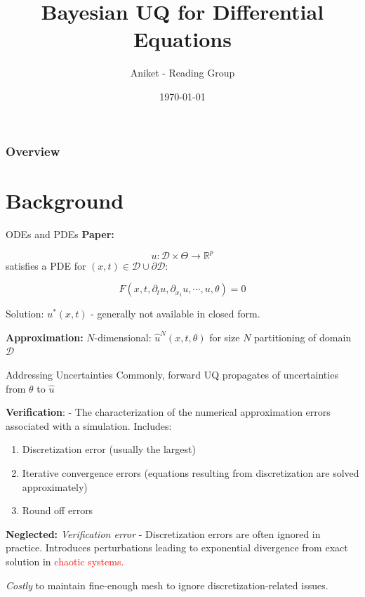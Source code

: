 \documentclass[usenames,dvipsnames]{beamer}
\title[Seminar]{Bayesian UQ for Differential Equations}
\author[AJ]{Aniket - Reading Group}
\institute[U-M]{University of Michigan}
\date{\today}
\theoremstyle{definition}
\let\oldcite=\cite
\renewcommand{\cite}[2][]{\textcolor{green}{\oldcite[#1]{#2}}}
\begin{document}
\begin{frame}
\titlepage %
\end{frame}



\begin{frame}
 \frametitle{Overview} %
 \tableofcontents %
\end{frame}

\section{Background}
\begin{frame}{ODEs and PDEs}
\textbf{Paper:} \cite{Chkrebtii2016}

$$u: \mathcal{D} \times \Theta \to \mathbb{R}^p$$ satisfies a PDE for $(x, t) \in \mathcal{D} \cup \partial \mathcal{D}$:

$$F(x, t, \partial_t u, \partial_{x_1} u, \cdots, u, \theta)=0$$

Solution: $u^{\ast}(x, t)$ - generally not available in closed form.

\textbf{Approximation:} $N$-dimensional: $\hat{u}^N(x, t, \theta)$ for size $N$ partitioning of domain $\mathcal{D}$

\end{frame}

\begin{frame}{Addressing Uncertainties}
Commonly, forward UQ propagates of uncertainties from $\theta$ to $\hat{u}$

\textbf{Verification}: \cite{roy_comprehensive_2011} - The characterization of the numerical approximation errors associated with a simulation. Includes:

\begin{enumerate}
\item Discretization error (usually the largest)
\item Iterative convergence errors (equations resulting from discretization are solved approximately)
\item Round off errors
\end{enumerate}

\textbf{Neglected: } \emph{Verification error} - Discretization errors are often ignored in practice. Introduces perturbations leading to exponential divergence from exact solution in \textcolor{red}{chaotic systems.}

\emph{Costly} to maintain fine-enough mesh to ignore discretization-related issues.

\end{frame}
\end{document}
